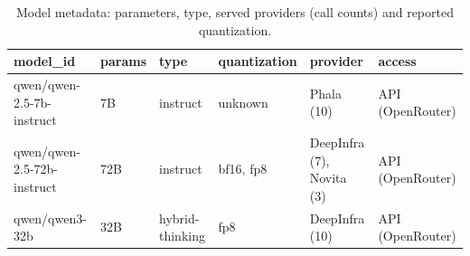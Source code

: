 \begin{table}[htbp]
\caption{Model metadata: parameters, type, served providers (call counts) and reported quantization.}
\label{tab:task1_metadata}
\begin{tabular}{llllll}
\toprule
model\_id & params & type & quantization & provider & access \\
\midrule
qwen/qwen-2.5-7b-instruct & 7B & instruct & unknown & Phala (10) & API (OpenRouter) \\
qwen/qwen-2.5-72b-instruct & 72B & instruct & bf16, fp8 & DeepInfra (7), Novita (3) & API (OpenRouter) \\
qwen/qwen3-32b & 32B & hybrid-thinking & fp8 & DeepInfra (10) & API (OpenRouter) \\
\bottomrule
\end{tabular}
\end{table}
